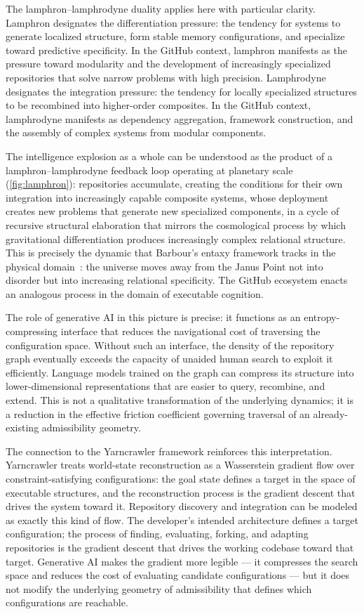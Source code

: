 \documentclass[12pt]{article}
\begin{document}
The lamphron--lamphrodyne duality applies here with particular clarity. Lamphron
designates the differentiation pressure: the tendency for systems to generate
localized structure, form stable memory configurations, and specialize toward
predictive specificity. In the GitHub context, lamphron manifests as the pressure
toward modularity and the development of increasingly specialized repositories
that solve narrow problems with high precision. Lamphrodyne designates the
integration pressure: the tendency for locally specialized structures to be
recombined into higher-order composites. In the GitHub context, lamphrodyne
manifests as dependency aggregation, framework construction, and the assembly of
complex systems from modular components.

The intelligence explosion as a whole can be understood as the product of a
lamphron--lamphrodyne feedback loop operating at planetary scale (\cref{fig:lamphron}):
repositories accumulate, creating the conditions for their own integration into
increasingly capable composite systems, whose deployment creates new problems
that generate new specialized components, in a cycle of recursive structural
elaboration that mirrors the cosmological process by which gravitational
differentiation produces increasingly complex relational structure. This is
precisely the dynamic that Barbour's entaxy framework tracks in the physical
domain~\cite{barbour2020}: the universe moves away from the Janus Point not
into disorder but into increasing relational specificity. The GitHub ecosystem
enacts an analogous process in the domain of executable cognition.

The role of generative AI in this picture is precise: it functions as an
entropy-compressing interface that reduces the navigational cost of traversing
the configuration space. Without such an interface, the density of the repository
graph eventually exceeds the capacity of unaided human search to exploit it
efficiently. Language models trained on the graph can compress its structure into
lower-dimensional representations that are easier to query, recombine, and
extend. This is not a qualitative transformation of the underlying dynamics; it
is a reduction in the effective friction coefficient governing traversal of an
already-existing admissibility geometry.

The connection to the Yarncrawler framework reinforces this interpretation.
Yarncrawler treats world-state reconstruction as a Wasserstein gradient flow over
constraint-satisfying configurations: the goal state defines a target in the
space of executable structures, and the reconstruction process is the gradient
descent that drives the system toward it. Repository discovery and integration
can be modeled as exactly this kind of flow. The developer's intended
architecture defines a target configuration; the process of finding, evaluating,
forking, and adapting repositories is the gradient descent that drives the
working codebase toward that target. Generative AI makes the gradient more
legible --- it compresses the search space and reduces the cost of evaluating
candidate configurations --- but it does not modify the underlying geometry of
admissibility that defines which configurations are reachable.
\end{document}
